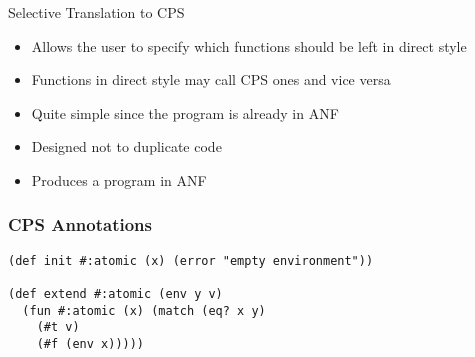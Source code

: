 \documentclass[handout]{beamer}
\begin{document}
\begin{frame}{Selective Translation to CPS}
  \begin{itemize}
    \item Allows the user to specify which functions should be left in direct style \pause
    \item Functions in direct style may call CPS ones and vice versa \pause
    \item Quite simple since the program is already in ANF \pause
    \item Designed not to duplicate code \pause
    \item Produces a program in ANF
  \end{itemize}
\end{frame}

\begin{frame}[fragile]
  \frametitle{CPS Annotations}
  \begin{lstlisting}
(def init #:atomic (x) (error "empty environment"))

(def extend #:atomic (env y v)
  (fun #:atomic (x) (match (eq? x y)
    (#t v)
    (#f (env x)))))
  \end{lstlisting}
\end{frame}
\end{document}
